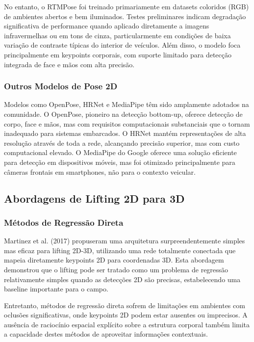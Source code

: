 \documentclass[12pt, a4paper]{article}
\begin{document}
No entanto, o RTMPose foi treinado primariamente em datasets coloridos (RGB) de ambientes abertos e bem iluminados. Testes preliminares indicam degradação significativa de performance quando aplicado diretamente a imagens infravermelhas ou em tons de cinza, particularmente em condições de baixa variação de contraste típicas do interior de veículos. Além disso, o modelo foca principalmente em keypoints corporais, com suporte limitado para detecção integrada de face e mãos com alta precisão.

\subsubsection{Outros Modelos de Pose 2D}

Modelos como OpenPose, HRNet e MediaPipe têm sido amplamente adotados na comunidade. O OpenPose, pioneiro na detecção bottom-up, oferece detecção de corpo, face e mãos, mas com requisitos computacionais substanciais que o tornam inadequado para sistemas embarcados. O HRNet mantém representações de alta resolução através de toda a rede, alcançando precisão superior, mas com custo computacional elevado. O MediaPipe do Google oferece uma solução eficiente para detecção em dispositivos móveis, mas foi otimizado principalmente para câmeras frontais em smartphones, não para o contexto veicular.

\subsection{Abordagens de Lifting 2D para 3D}

\subsubsection{Métodos de Regressão Direta}

Martinez et al. (2017) propuseram uma arquitetura surpreendentemente simples mas eficaz para lifting 2D-3D, utilizando uma rede totalmente conectada que mapeia diretamente keypoints 2D para coordenadas 3D. Esta abordagem demonstrou que o lifting pode ser tratado como um problema de regressão relativamente simples quando as detecções 2D são precisas, estabelecendo uma baseline importante para o campo.

Entretanto, métodos de regressão direta sofrem de limitações em ambientes com oclusões significativas, onde keypoints 2D podem estar ausentes ou imprecisos. A ausência de raciocínio espacial explícito sobre a estrutura corporal também limita a capacidade destes métodos de aproveitar informações contextuais.
\end{document}
